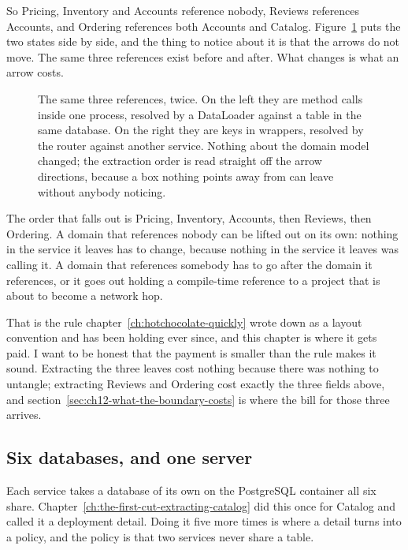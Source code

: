 So Pricing, Inventory and Accounts reference nobody, Reviews references
Accounts, and Ordering references both Accounts and Catalog.
Figure~\ref{fig:ch12-domain-dependencies} puts the two states side by side, and the
thing to notice about it is that the arrows do not move. The same three
references exist before and after. What changes is what an arrow costs.

\begin{figure}[htbp]
  \centering
  
  \caption{The same three references, twice. On the left they are method calls
  inside one process, resolved by a DataLoader against a table in the same
  database. On the right they are keys in wrappers, resolved by the router
  against another service. Nothing about the domain model changed; the
  extraction order is read straight off the arrow directions, because a box
  nothing points away from can leave without anybody noticing.}
  \label{fig:ch12-domain-dependencies}
\end{figure}

%
The order that falls out is Pricing, Inventory, Accounts, then Reviews, then
Ordering. A domain that references nobody can be lifted out on its own: nothing
in the service it leaves has to change, because nothing in the service it leaves
was calling it. A domain that references somebody has to go after the domain it
references, or it goes out holding a compile-time reference to a project that is
about to become a network hop.

That is the rule chapter~\ref{ch:hotchocolate-quickly} wrote down as a layout
convention and has been holding ever since, and this chapter is where it gets
paid. I want to be honest that the payment is smaller than the rule makes it
sound. Extracting the three leaves cost nothing because there was nothing to
untangle; extracting Reviews and Ordering cost exactly the three fields above,
and section~\ref{sec:ch12-what-the-boundary-costs} is where the bill for those
three arrives.

\subsection*{Six databases, and one server}

%
Each service takes a database of its own on the PostgreSQL container all six
share. Chapter~\ref{ch:the-first-cut-extracting-catalog} did this once for
Catalog and called it a deployment detail. Doing it five more times is where a
detail turns into a policy, and the policy is that two services never share a
table.

